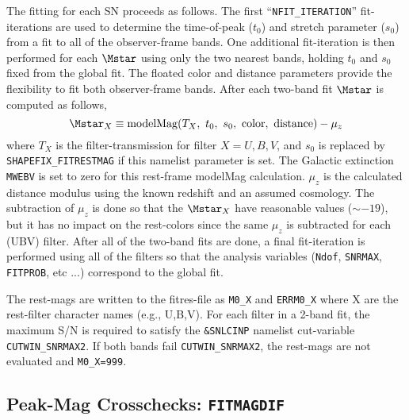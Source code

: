 \documentclass[12pt]{article}
\begin{document}
The fitting for each SN proceeds as follows.
The first ``{\tt NFIT\_ITERATION}'' fit-iterations are used
to determine the time-of-peak ($t_0$) and stretch parameter
($s_0$) from a fit to all of the observer-frame bands. 
One additional fit-iteration is then performed for each 
$\Mstar$ using only the two nearest bands, 
holding $t_0$ and $s_0$ fixed from the global fit.
The floated color and distance parameters provide the 
flexibility to fit both observer-frame bands. 
After each two-band fit $\Mstar$ is computed as follows,
\begin{equation}
  \Mstar_X \equiv  {\rm modelMag}(T_X,~t_0,~s_0,~{\rm color,~distance})
        - {\mu}_z
\end{equation}
%
where $T_X$ is the filter-transmission for filter $X=U,B,V$,
and $s_0$ is replaced by {\tt SHAPEFIX\_FITRESTMAG} 
if this namelist parameter is set. 
The Galactic extinction {\tt MWEBV} is set to zero for 
this rest-frame modelMag calculation.
$\mu_z$ is the calculated distance modulus using the known
redshift and an assumed cosmology. The subtraction of $\mu_z$
is done so that the $\Mstar_X$ have reasonable values ($\sim -19$),
but it has no impact on the rest-colors since the same $\mu_z$
is subtracted for each (UBV) filter. After all of the two-band
fits are done, a final fit-iteration is performed using all
of the filters so that the analysis variables 
({\tt Ndof}, {\tt SNRMAX}, {\tt FITPROB}, etc ...) 
correspond to the global fit.


The rest-mags are written to the fitres-file
as {\tt M0\_X} and {\tt ERRM0\_X} where X are the 
rest-filter character names (e.g., U,B,V).
For each filter in a 2-band fit, the maximum S/N 
is required to satisfy the {\tt \&SNLCINP} namelist 
cut-variable {\tt CUTWIN\_SNRMAX2}.
If both bands fail {\tt CUTWIN\_SNRMAX2}, the rest-mags 
are not evaluated and {\tt M0\_X=999}.


   \subsection{Peak-Mag Crosschecks: {\tt FITMAGDIF}}
   \label{subsec:FITMAGDIF}
\end{document}
